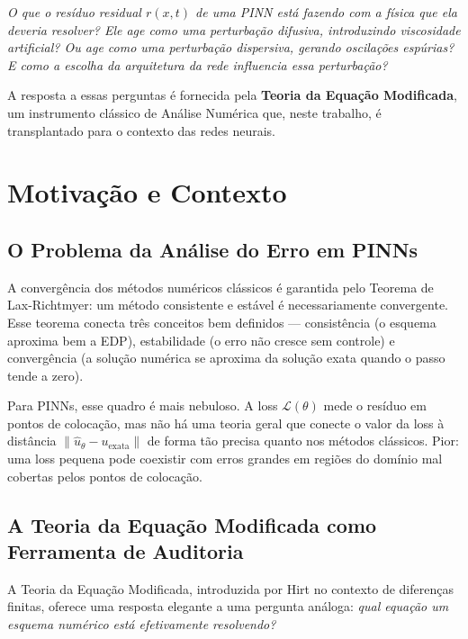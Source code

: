 \documentclass[12pt, a4paper]{article}
\theoremstyle{definition}
\newcommand{\loss}{\mathcal{L}}
\newcommand{\pinn}{\hat{u}_\theta}
\newcommand{\norm}[1]{\left\lVert #1 \right\rVert}
\begin{document}
\begin{perguntabox}
\textit{O que o resíduo residual $r(x,t)$ de uma PINN está fazendo com a física que
ela deveria resolver? Ele age como uma perturbação difusiva, introduzindo viscosidade
artificial? Ou age como uma perturbação dispersiva, gerando oscilações espúrias?
E como a escolha da arquitetura da rede influencia essa perturbação?}
\end{perguntabox}

A resposta a essas perguntas é fornecida pela \textbf{Teoria da Equação Modificada},
um instrumento clássico de Análise Numérica que, neste trabalho, é transplantado
para o contexto das redes neurais.

\section{Motivação e Contexto}

\subsection{O Problema da Análise do Erro em PINNs}

A convergência dos métodos numéricos clássicos é garantida pelo Teorema de
Lax-Richtmyer: um método consistente e estável é necessariamente convergente.
Esse teorema conecta três conceitos bem definidos --- consistência (o esquema
aproxima bem a EDP), estabilidade (o erro não cresce sem controle) e convergência
(a solução numérica se aproxima da solução exata quando o passo tende a zero).

Para PINNs, esse quadro é mais nebuloso. A loss $\loss(\theta)$ mede o resíduo
em pontos de colocação, mas não há uma teoria geral que conecte o valor da loss
à distância $\norm{\pinn - u_{\text{exata}}}$ de forma tão precisa quanto nos métodos
clássicos. Pior: uma loss pequena pode coexistir com erros grandes em regiões do
domínio mal cobertas pelos pontos de colocação.

\subsection{A Teoria da Equação Modificada como Ferramenta de Auditoria}

A Teoria da Equação Modificada, introduzida por Hirt \cite{hirt1968} no contexto de
diferenças finitas, oferece uma resposta elegante a uma pergunta análoga: \textit{qual
equação um esquema numérico está efetivamente resolvendo?}
\end{document}
